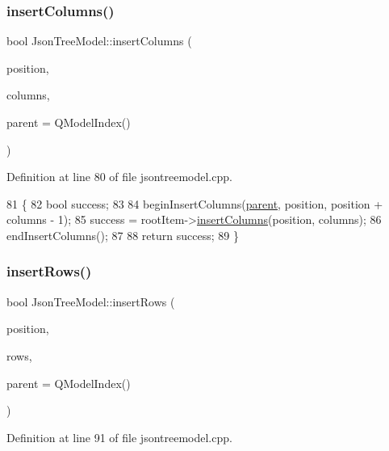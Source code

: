 \subsubsection{\texorpdfstring{insert\+Columns()}{insertColumns()}}
{\footnotesize\ttfamily bool Json\+Tree\+Model\+::insert\+Columns (\begin{DoxyParamCaption}\item[{int}]{position,  }\item[{int}]{columns,  }\item[{const Q\+Model\+Index \&}]{parent = {\ttfamily QModelIndex()} }\end{DoxyParamCaption})}



Definition at line 80 of file jsontreemodel.\+cpp.


\begin{DoxyCode}
81 \{
82     \textcolor{keywordtype}{bool} success;
83 
84     beginInsertColumns(\hyperlink{class_json_tree_model_aea54120cdf66d49e8f0ad176eed8fc99}{parent}, position, position + columns - 1);
85     success = rootItem->\hyperlink{class_json_tree_item_a189b5b2926b94dc53f3aaa366cf66b05}{insertColumns}(position, columns);
86     endInsertColumns();
87 
88     \textcolor{keywordflow}{return} success;
89 \}
\end{DoxyCode}
\mbox{\label{class_json_tree_model_a44b67b632a69a48b087a5bc7bdf7caf5}} 
\subsubsection{\texorpdfstring{insert\+Rows()}{insertRows()}}
{\footnotesize\ttfamily bool Json\+Tree\+Model\+::insert\+Rows (\begin{DoxyParamCaption}\item[{int}]{position,  }\item[{int}]{rows,  }\item[{const Q\+Model\+Index \&}]{parent = {\ttfamily QModelIndex()} }\end{DoxyParamCaption})}



Definition at line 91 of file jsontreemodel.\+cpp.


